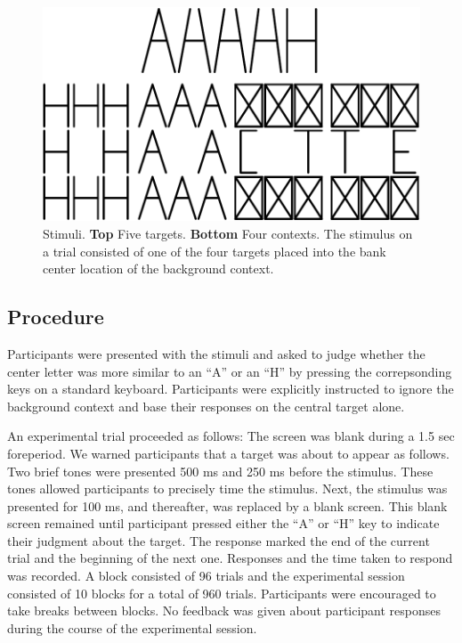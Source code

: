 \documentclass[english,floatsintext,man]{apa6}
\begin{document}
\begin{figure}[htbp]
\centering
\includegraphics{paper_files/figure-latex/stimulus-1.pdf}
\caption{\label{fig:stimulus}Stimuli. \textbf{Top} Five targets.
\textbf{Bottom} Four contexts. The stimulus on a trial consisted of one
of the four targets placed into the bank center location of the
background context.}
\end{figure}

\subsection{Procedure}\label{procedure}

Participants were presented with the stimuli and asked to judge whether
the center letter was more similar to an \enquote{A} or an \enquote{H}
by pressing the correpsonding keys on a standard keyboard. Participants
were explicitly instructed to ignore the background context and base
their responses on the central target alone.

An experimental trial proceeded as follows: The screen was blank during
a 1.5 sec foreperiod. We warned participants that a target was about to
appear as follows. Two brief tones were presented 500 ms and 250 ms
before the stimulus. These tones allowed participants to precisely time
the stimulus. Next, the stimulus was presented for 100 ms, and
thereafter, was replaced by a blank screen. This blank screen remained
until participant pressed either the \enquote{A} or \enquote{H} key to
indicate their judgment about the target. The response marked the end of
the current trial and the beginning of the next one. Responses and the
time taken to respond was recorded. A block consisted of 96 trials and
the experimental session consisted of 10 blocks for a total of 960
trials. Participants were encouraged to take breaks between blocks. No
feedback was given about participant responses during the course of the
experimental session.
\end{document}
